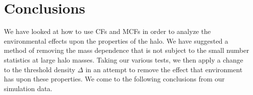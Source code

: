 \documentclass[usenatbib]{mnras}
\begin{document}
\section[]{Conclusions}
\label{section:conclusions}

We have looked at how to use CFs and MCFs in order to analyze the environmental effects upon the properties of the halo. We have suggested a method of removing the mass dependence that is not subject to the small number statistics at large halo masses. Taking our various tests, we then apply a change to the threshold density $\Delta$ in an attempt to remove the effect that environment has upon these properties. We come to the following conclusions from our simulation data.
\end{document}
